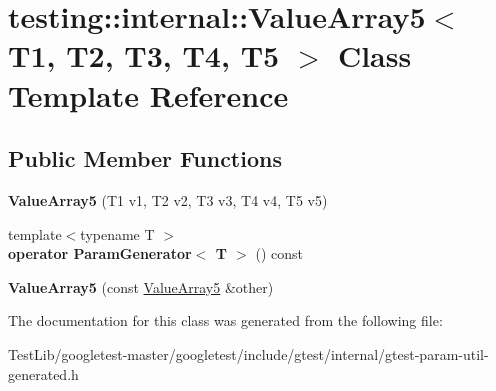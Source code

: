 \hypertarget{classtesting_1_1internal_1_1ValueArray5}{}\section{testing\+:\+:internal\+:\+:Value\+Array5$<$ T1, T2, T3, T4, T5 $>$ Class Template Reference}
\label{classtesting_1_1internal_1_1ValueArray5}
\subsection*{Public Member Functions}
\begin{DoxyCompactItemize}
\item 
\mbox{\label{classtesting_1_1internal_1_1ValueArray5_a9c5687fd18da21263aebc21b9ea508b8}} 
{\bfseries Value\+Array5} (T1 v1, T2 v2, T3 v3, T4 v4, T5 v5)
\item 
\mbox{\label{classtesting_1_1internal_1_1ValueArray5_ab925a168d89be9964c4319e5212222c1}} 
{\footnotesize template$<$typename T $>$ }\\{\bfseries operator Param\+Generator$<$ T $>$} () const
\item 
\mbox{\label{classtesting_1_1internal_1_1ValueArray5_a7de67e844073d0ec3c7c6e5736fb9ba6}} 
{\bfseries Value\+Array5} (const \hyperlink{classtesting_1_1internal_1_1ValueArray5}{Value\+Array5} \&other)
\end{DoxyCompactItemize}


The documentation for this class was generated from the following file\+:\begin{DoxyCompactItemize}
\item 
Test\+Lib/googletest-\/master/googletest/include/gtest/internal/gtest-\/param-\/util-\/generated.\+h\end{DoxyCompactItemize}
